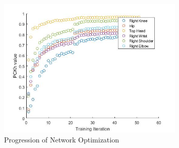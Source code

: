 \documentclass{scrreprt}
\begin{document}
\begin{figure}[!ht]
   \caption{Progression of Network Optimization}
   \label{erDiagram}
    \centering
    \includegraphics[width=0.8\textwidth]{pckh.jpg}
\end{figure}
\end{document}
